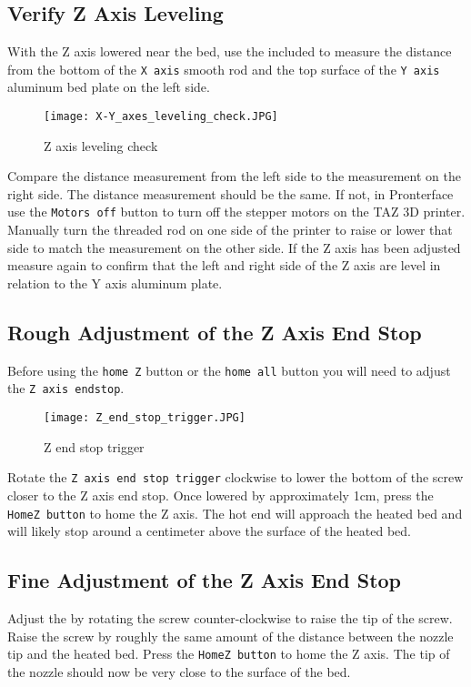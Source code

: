 \subsection{Verify Z Axis Leveling}
With the Z axis lowered near the bed, use the included  to measure the distance from the bottom of the \texttt{X axis} smooth rod and the top surface of the \texttt{Y axis} aluminum bed plate on the left side.
\begin{figure}[hbt]
\centering
\texttt{[image: X-Y\_axes\_leveling\_check.JPG]}
\caption{Z axis leveling check}
\label{fig:X-Y_axes_leveling_check}
\end{figure}
Compare the distance measurement from the left side to the measurement on the right side. The distance measurement should be the same. If not, in Pronterface use the \texttt{Motors off} button to turn off the stepper motors on the TAZ 3D printer. Manually turn the threaded rod on one side of the printer to raise or lower that side to match the measurement on the other side. If the Z axis has been adjusted measure again to confirm that the left and right side of the Z axis are level in relation to the Y axis aluminum plate.

\subsection{Rough Adjustment of the Z Axis End Stop}
Before using the \texttt{home Z} button or the \texttt{home all} button you will need to adjust the \texttt{Z axis endstop}.
\begin{figure}[p]
\centering
\texttt{[image: Z\_end\_stop\_trigger.JPG]}
\caption{Z end stop trigger}
\label{fig:Z_end_stop_trigger}
\end{figure}
Rotate the \texttt{Z axis end stop trigger} clockwise to lower the bottom of the screw closer to the Z axis end stop. Once lowered by approximately 1cm, press the \texttt{HomeZ button} to home the Z axis. The hot end will approach the heated bed and will likely stop around a centimeter above the surface of the heated bed.

\subsection{Fine Adjustment of the Z Axis End Stop}
Adjust the  by rotating the screw counter-clockwise to raise the tip of the screw. Raise the screw by roughly the same amount of the distance between the nozzle tip and the heated bed. Press the \texttt{HomeZ button} to home the Z axis. The tip of the nozzle should now be very close to the surface of the bed.

